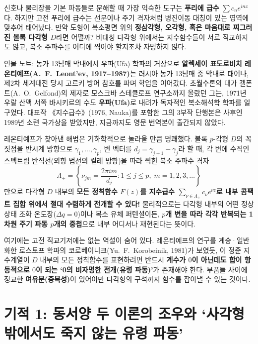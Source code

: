 \documentclass[11pt,a4paper]{article}
\begin{document}
신호나 물리장을 기본 파동들로 분해할 때 가장 익숙한 도구는 \textbf{푸리에 급수} $\sum c_n e^{inx}$다. 하지만 고전 푸리에 급수는 선분이나 주기 격자처럼 병진이동 대칭이 있는 영역에 맞추어 태어났다. 만약 도형이 복소평면 위의 \textbf{정삼각형, 오각형, 혹은 마음대로 찌그러진 볼록 다각형 $D$}라면 어떨까? 비대칭 다각형 위에서는 지수함수들이 서로 직교하지도 않고, 복소 주파수를 어디에 찍어야 할지조차 자명하지 않다.

\begin{storybox}{인물 노트: 농가 13남매 막내에서 우파(Ufa) 학파의 거장으로}
\textbf{알렉세이 표도로비치 레온티예프(A.~F.~Leont'ev, 1917–1987)}는 러시아 농가 13남매 중 막내로 태어나, 제2차 세계대전 당시 고르키 방어 참호를 파며 학업을 이어갔다. 초월수론의 대가 겔폰트(A.~O.~Gelfond)의 제자로 모스크바 스테클로프 연구소까지 올랐던 그는, 1971년 우랄 산맥 서쪽 바시키르의 수도 \textbf{우파(Ufa)}로 내려가 독자적인 복소해석학 학파를 일구었다. 대표작 《지수급수》(1976, Nauka)를 포함한 그의 3부작 단행본은 사후인 1989년 소련 국가상을 받았지만, 지금까지도 영문 번역본이 출간되지 않았다.
\end{storybox}

레온티예프가 찾아낸 해법은 기하학적으로 놀라울 만큼 명쾌했다. 볼록 $p$-각형 $D$의 꼭짓점을 반시계 방향으로 $\gamma_1, \dots, \gamma_p$, 변 벡터를 $d_j = \gamma_{j+1}-\gamma_j$라 할 때, 각 변에 수직인 스펙트럼 반직선(외향 법선의 켤레 방향)을 따라 찍힌 복소 주파수 격자
\begin{equation}
  \Lambda_+ = \left\{ \nu_{jm} = \frac{2\pi i m}{d_j} : 1 \le j \le p,\; m = 1, 2, 3, \dots \right\}
\end{equation}
만으로 다각형 $D$ 내부의 \textbf{모든 정칙함수 $F(z)$를 지수급수 $\sum_{\nu \in \Lambda_+} c_\nu e^{\nu z}$로 내부 콤팩트 집합 위에서 절대 수렴하게 전개할 수 있다!} 물리적으로는 다각형 내부의 어떤 정상상태 조화 온도장($\Delta q = 0$)이나 복소 유체 퍼텐셜이든, \textbf{$p$개 변을 따라 각각 반복되는 1차원 주기 파동 $p$개의 중첩}으로 내부 어디서나 재현된다는 뜻이다.

여기에는 고전 직교기저에는 없는 역설이 숨어 있다. 레온티예프의 연구를 계승·일반화한 로스토프 학파의 코로베이니크(Yu.~F.~Korobeinik, 1981)가 보였듯, 이 정준 지수계열이 $D$ 내부의 모든 정칙함수를 표현하려면 반드시 \textbf{계수가 $0$이 아닌데도 합이 항등적으로 $0$이 되는 `0의 비자명한 전개(유령 파동)'}가 존재해야 한다. 부품들 사이에 정교한 \textbf{여유분(중복성)}이 있어야만 다각형의 구석까지 함수를 잡아낼 수 있는 것이다.

\section{기적 1: 동서양 두 이론의 조우와 `사각형 밖에서도 죽지 않는 유령 파동'}
\end{document}
